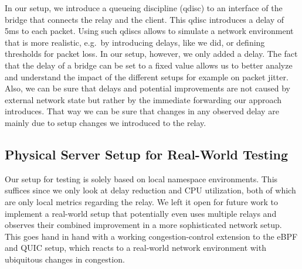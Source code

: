
In our setup, we introduce a queueing discipline (qdisc) to an interface
of the bridge that connects the relay and the client.
This qdisc introduces a delay of 5ms to each packet.
Using such qdiscs allows to simulate a network environment that is more realistic, 
e.g.~by introducing delays, like we did, or defining thresholds for packet loss.
In our setup, however, we only added a delay. %
The fact that the delay of a bridge can be set to a fixed value allows us to better 
analyze and understand the impact of the different setups for example on packet jitter.
Also, we can be sure that delays and potential improvements are not caused by external
network state but rather by the immediate forwarding our approach introduces.
That way we can be sure that changes in any observed delay are mainly due to setup changes 
we introduced to the relay.

\subsection{Physical Server Setup for Real-World Testing}\label{subsec:physical_server_setup}
Our setup for testing is solely based on local namespace environments.
This suffices since we only look at delay reduction and CPU utilization, 
both of which are only local metrics regarding the relay.
We left it open for future work to implement a real-world setup that 
potentially even uses multiple relays and observes their combined improvement
in a more sophisticated network setup.
This goes hand in hand with a working congestion-control extension to the eBPF and 
QUIC setup, which reacts to a real-world network environment with ubiquitous changes 
in congestion.
